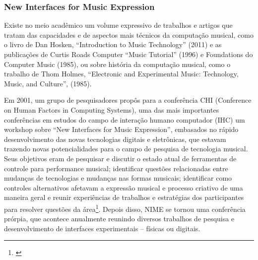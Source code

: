 
\subsubsection{New Interfaces for Music Expression}



Existe no meio acadêmico um volume expressivo de trabalhos e artigos que tratam das capacidades e de aspectos mais técnicos da computação musical, como o livro de Dan Hosken, ``Introduction to Music Technology'' (2011) e as publicações de Curtis Roads Computer ``Music Tutorial'' (1996) e Foundations do Computer Music (1985), ou sobre história da computação musical, como o trabalho de Thom Holmes, ``Electronic and Experimental Music: Technology, Music, and Culture'', (1985). 

Em 2001, um grupo de pesquisadores propôs para a conferência CHI (Conference on Human Factors in Computing Systems), uma das mais importantes conferências em estudos do campo de interação humano computador (IHC) um workshop sobre ``New Interfaces for Music Expression'', embasados no rápido desenvolvimento das novas tecnologias digitais e eletrônicas, que estavam trazendo novas potencialidades para o campo de pesquisa de tecnologia musical. Seus objetivos eram de pesquisar e discutir o estado atual de ferramentas de controle para performance musical; identificar questões relacionadas entre mudanças de tecnologias e mudanças nas formas musicais; identificar como controles alternativos afetavam a expressão musical e processo criativo de uma maneira geral e reunir experiências de trabalhos e estratégias dos participantes para resolver questões da área\footnote{\cite{Poupyrev2001}}. Depois disso, NIME se tornou uma conferência prórpia, que acontece anualmente reunindo diversos trabalhos de pesquisa e desenvolvimento de interfaces experimentais – físicas ou digitais. 


